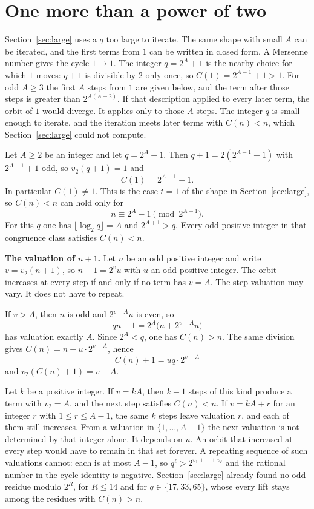 \documentclass[11pt]{article}
\newcommand{\topic}[1]{\par\noindent\textbf{#1}}
\begin{document}
\section{One more than a power of two}
\label{sec:power}

Section~\ref{sec:large} uses a \(q\) too large to iterate.
The same shape with small \(A\) can be iterated, and the first terms from \(1\) can be written in closed form.
A Mersenne number gives the cycle \(1 \to 1\).
The integer \(q = 2^A + 1\) is the nearby choice for which \(1\) moves: \(q + 1\) is divisible by \(2\) only once, so \(C(1) = 2^{A-1} + 1 > 1\).
For odd \(A \ge 3\) the first \(A\) steps from \(1\) are given below, and the term after those steps is greater than \(2^{A(A-2)}\).
If that description applied to every later term, the orbit of \(1\) would diverge.
It applies only to those \(A\) steps.
The integer \(q\) is small enough to iterate, and the iteration meets later terms with \(C(n) < n\), which Section~\ref{sec:large} could not compute.

Let \(A \ge 2\) be an integer and let \(q = 2^A + 1\).
Then \(q + 1 = 2(2^{A-1} + 1)\) with \(2^{A-1} + 1\) odd, so \(v_2(q + 1) = 1\) and
\[
C(1) = 2^{A-1} + 1.
\]
In particular \(C(1) \ne 1\).
This is the case \(t = 1\) of the shape in Section~\ref{sec:large}, so \(C(n) < n\) can hold only for
\[
n \equiv 2^A - 1 \pmod{2^{A+1}}.
\]
For this \(q\) one has \(\lfloor \log_2 q \rfloor = A\) and \(2^{A+1} > q\).
Every odd positive integer in that congruence class satisfies \(C(n) < n\).

\topic{The valuation of \(n+1\).}
Let \(n\) be an odd positive integer and write \(v = v_2(n+1)\), so \(n + 1 = 2^v u\) with \(u\) an odd positive integer.
The orbit increases at every step if and only if no term has \(v = A\).
The step valuation may vary. It does not have to repeat.

If \(v > A\), then \(n\) is odd and \(2^{v-A} u\) is even, so
\[
qn + 1 = 2^A\bigl(n + 2^{v-A} u\bigr)
\]
has valuation exactly \(A\).
Since \(2^A < q\), one has \(C(n) > n\).
The same division gives \(C(n) = n + u \cdot 2^{v-A}\), hence
\[
C(n) + 1 = u q \cdot 2^{v-A}
\]
and \(v_2(C(n)+1) = v - A\).

Let \(k\) be a positive integer.
If \(v = kA\), then \(k - 1\) steps of this kind produce a term with \(v_2 = A\), and the next step satisfies \(C(n) < n\).
If \(v = kA + r\) for an integer \(r\) with \(1 \le r \le A - 1\), the same \(k\) steps leave valuation \(r\), and each of them still increases.
From a valuation in \(\{1, \ldots, A-1\}\) the next valuation is not determined by that integer alone.
It depends on \(u\).
An orbit that increased at every step would have to remain in that set forever.
A repeating sequence of such valuations cannot: each is at most \(A - 1\), so \(q^\ell > 2^{v_1 + \cdots + v_\ell}\) and the rational number in the cycle identity is negative.
Section~\ref{sec:large} already found no odd residue modulo \(2^R\), for \(R \le 14\) and for \(q \in \{17, 33, 65\}\), whose every lift stays among the residues with \(C(n) > n\).
\end{document}
